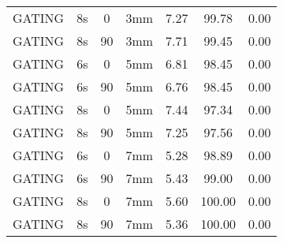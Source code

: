\begin{table}[H]
\begin{tabular}{|c||c|c|c||c|c|c|}
GATING & 8s & 0 & 3mm & 7.27 & 99.78 & 0.00 \\
GATING & 8s & 90 & 3mm & 7.71 & 99.45 & 0.00 \\
GATING & 6s & 0 & 5mm & 6.81 & 98.45 & 0.00 \\
GATING & 6s & 90 & 5mm & 6.76 & 98.45 & 0.00 \\
GATING & 8s & 0 & 5mm & 7.44 & 97.34 & 0.00 \\
GATING & 8s & 90 & 5mm & 7.25 & 97.56 & 0.00 \\
GATING & 6s & 0 & 7mm & 5.28 & 98.89 & 0.00 \\
GATING & 6s & 90 & 7mm & 5.43 & 99.00 & 0.00 \\
GATING & 8s & 0 & 7mm & 5.60 & 100.00 & 0.00 \\
GATING & 8s & 90 & 7mm & 5.36 & 100.00 & 0.00 \\
    \hline\hline 
  \end{tabular}
\end{table}

\newpage

